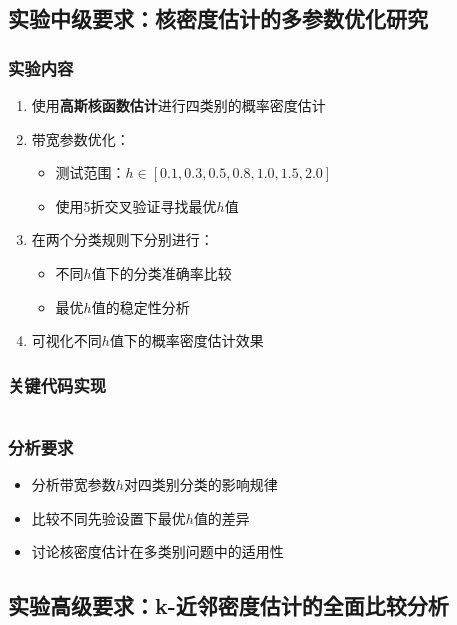 \documentclass[12pt]{article}
\begin{document}
\subsection{实验中级要求：核密度估计的多参数优化研究}

\subsubsection{实验内容}
\begin{enumerate}
    \item 使用\textbf{高斯核函数估计}进行四类别的概率密度估计
    \item 带宽参数优化：
    \begin{itemize}
        \item 测试范围：$h \in [0.1, 0.3, 0.5, 0.8, 1.0, 1.5, 2.0]$
        \item 使用5折交叉验证寻找最优$h$值
    \end{itemize}
    \item 在两个分类规则下分别进行：
    \begin{itemize}
        \item 不同$h$值下的分类准确率比较
        \item 最优$h$值的稳定性分析
    \end{itemize}
    \item 可视化不同$h$值下的概率密度估计效果
\end{enumerate}

\subsubsection{关键代码实现}
\begin{lstlisting}[caption=核密度估计代码]

\end{lstlisting}

\subsubsection{分析要求}
\begin{itemize}
    \item 分析带宽参数$h$对四类别分类的影响规律
    \item 比较不同先验设置下最优$h$值的差异
    \item 讨论核密度估计在多类别问题中的适用性
\end{itemize}

\subsection{实验高级要求：k-近邻密度估计的全面比较分析}
\end{document}
